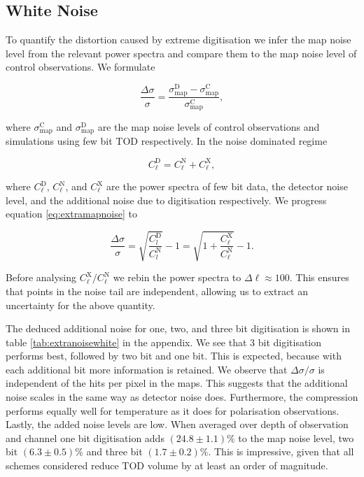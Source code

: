 \documentclass[apj]{emulateapj}
\begin{document}
\subsection{White Noise}
\label{subsec:whitenoise}

To quantify the distortion caused by extreme digitisation we infer the map noise level from the relevant power spectra and compare them to the map noise level of control observations. We formulate

\begin{equation} \label{eq:extramapnoise}
\frac{\Delta \sigma}{\sigma} = \frac{\sigma_{\mathrm{map}}^{\mathrm{D}}-\sigma_{\mathrm{map}}^{\mathrm{C}}}{\sigma_{\mathrm{map}}^{\mathrm{C}}},
\end{equation}

where $\sigma_{\mathrm{map}}^{\mathrm{C}}$ and $\sigma_{\mathrm{map}}^{\mathrm{D}}$ are the map noise levels of control observations and simulations using few bit TOD respectively. In the noise dominated regime

\begin{equation} C_{\ell}^\mathrm{D} = C_\ell^\mathrm{N} + C_\ell^\mathrm{X}, \end{equation}

where $C_{\ell}^\mathrm{D}$, $ C_\ell^\mathrm{N}$, and $C_\ell^\mathrm{X}$ are the power spectra of few bit data, the detector noise level, and the additional noise due to digitisation respectively. We progress equation \ref{eq:extramapnoise} to

\begin{equation}\frac{\Delta \sigma}{\sigma} = \sqrt{\frac{C_l^\mathrm{D}}{C_l^{\mathrm{N}}}} - 1 = \sqrt{1 + \frac{C_\ell^\mathrm{X}}{C_\ell^{\mathrm{N}}}} - 1. \end{equation}

Before analysing $C_\ell^\mathrm{X}/C_\ell^\mathrm{N}$ we rebin the power spectra to $\Delta \ell \approx 100$. This ensures that points in the noise tail are independent, allowing us to extract an uncertainty for the above quantity.

The deduced additional noise for one, two, and three bit digitisation is shown in table \ref{tab:extranoisewhite} in the appendix. We see that 3 bit digitisation performs best, followed by two bit and one bit. This is expected, because with each additional bit more information is retained. We observe that $\Delta \sigma / \sigma$ is independent of the hits per pixel in the maps. This suggests that the additional noise scales in the same way as detector noise does. Furthermore, the compression performs equally well for temperature as it does for polarisation observations. Lastly, the added noise levels are low. When averaged over depth of observation and channel one bit digitisation adds $(24.8\pm 1.1)\%$ to the map noise level, two bit $(6.3\pm0.5)\%$ and three bit $(1.7\pm0.2)\%$. This is impressive, given that all schemes considered reduce TOD volume by at least an order of magnitude.
\end{document}
